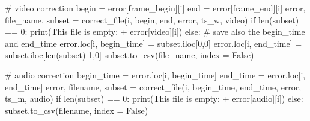 \documentclass[
  letterpaper,
  DIV=11,
  numbers=noendperiod]{scrreprt}
\newenvironment{Shaded}{\begin{snugshade}}{\end{snugshade}}
\newcommand{\BuiltInTok}[1]{\textcolor[rgb]{0.00,0.23,0.31}{#1}}
\newcommand{\CommentTok}[1]{\textcolor[rgb]{0.37,0.37,0.37}{#1}}
\newcommand{\ControlFlowTok}[1]{\textcolor[rgb]{0.00,0.23,0.31}{#1}}
\newcommand{\DecValTok}[1]{\textcolor[rgb]{0.68,0.00,0.00}{#1}}
\newcommand{\NormalTok}[1]{\textcolor[rgb]{0.00,0.23,0.31}{#1}}
\newcommand{\OperatorTok}[1]{\textcolor[rgb]{0.37,0.37,0.37}{#1}}
\newcommand{\StringTok}[1]{\textcolor[rgb]{0.13,0.47,0.30}{#1}}
\newcommand{\VariableTok}[1]{\textcolor[rgb]{0.07,0.07,0.07}{#1}}
\begin{document}
\begin{Shaded}
\begin{Highlighting}[]
        \CommentTok{\# video correction }
\NormalTok{        begin }\OperatorTok{=}\NormalTok{ error[}\StringTok{\textquotesingle{}frame\_begin\textquotesingle{}}\NormalTok{][i]}
\NormalTok{        end }\OperatorTok{=}\NormalTok{ error[}\StringTok{\textquotesingle{}frame\_end\textquotesingle{}}\NormalTok{][i]}
\NormalTok{        error, file\_name, subset }\OperatorTok{=}\NormalTok{ correct\_file(i, begin, end, error, ts\_w, }\StringTok{\textquotesingle{}video\textquotesingle{}}\NormalTok{)}
        \ControlFlowTok{if} \BuiltInTok{len}\NormalTok{(subset) }\OperatorTok{==} \DecValTok{0}\NormalTok{:}
            \BuiltInTok{print}\NormalTok{(}\StringTok{\textquotesingle{}This file is empty: \textquotesingle{}} \OperatorTok{+}\NormalTok{ error[}\StringTok{\textquotesingle{}video\textquotesingle{}}\NormalTok{][i])}
        \ControlFlowTok{else}\NormalTok{:}
            \CommentTok{\# save also the begin\_time and end\_time}
\NormalTok{            error.loc[i, }\StringTok{\textquotesingle{}begin\_time\textquotesingle{}}\NormalTok{] }\OperatorTok{=}\NormalTok{ subset.iloc[}\DecValTok{0}\NormalTok{,}\DecValTok{0}\NormalTok{]}
\NormalTok{            error.loc[i, }\StringTok{\textquotesingle{}end\_time\textquotesingle{}}\NormalTok{] }\OperatorTok{=}\NormalTok{ subset.iloc[}\BuiltInTok{len}\NormalTok{(subset)}\OperatorTok{{-}}\DecValTok{1}\NormalTok{,}\DecValTok{0}\NormalTok{]}
\NormalTok{            subset.to\_csv(file\_name, index }\OperatorTok{=} \VariableTok{False}\NormalTok{)  }

        \CommentTok{\# audio correction}
\NormalTok{        begin\_time }\OperatorTok{=}\NormalTok{ error.loc[i, }\StringTok{\textquotesingle{}begin\_time\textquotesingle{}}\NormalTok{]}
\NormalTok{        end\_time }\OperatorTok{=}\NormalTok{ error.loc[i, }\StringTok{\textquotesingle{}end\_time\textquotesingle{}}\NormalTok{]}
\NormalTok{        error, filename, subset }\OperatorTok{=}\NormalTok{ correct\_file(i, begin\_time, end\_time, error, ts\_m, }\StringTok{\textquotesingle{}audio\textquotesingle{}}\NormalTok{)}
        \ControlFlowTok{if} \BuiltInTok{len}\NormalTok{(subset) }\OperatorTok{==} \DecValTok{0}\NormalTok{:}
            \BuiltInTok{print}\NormalTok{(}\StringTok{\textquotesingle{}This file is empty: \textquotesingle{}} \OperatorTok{+}\NormalTok{ error[}\StringTok{\textquotesingle{}audio\textquotesingle{}}\NormalTok{][i])}
        \ControlFlowTok{else}\NormalTok{:}
\NormalTok{            subset.to\_csv(filename, index }\OperatorTok{=} \VariableTok{False}\NormalTok{)}
            

\end{Highlighting}
\end{Shaded}
\end{document}
